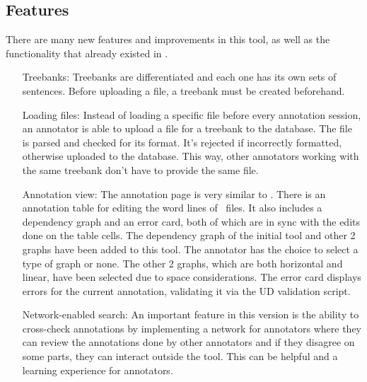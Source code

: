 \subsection{Features}
\label{sec:features}

There are many new features and improvements in this tool, as well as the functionality that already existed in \boatvone.

\begin{itemize}[before=\normalfont, font=\itshape, align=left]
\item[Treebanks:] Treebanks are differentiated and each one has its own sets of sentences.
Before uploading a \conllu{} file, a treebank must be created beforehand.

\item[Loading files:] Instead of loading a specific file before every annotation session, an annotator is able to upload a \conllu{} file for a treebank to the database.
The file is parsed and checked for its format. It's rejected if incorrectly formatted, otherwise uploaded to the database.
This way, other annotators working with the same treebank don't have to provide the same file.

\item[Annotation view:] The annotation page is very similar to \boatvone.
There is an annotation table for editing the word lines of \conllu\ files.
It also includes a dependency graph and an error card, both of which are in sync with the edits done on the table cells.
The dependency graph of the initial tool and other 2 graphs have been added to this tool.
The annotator has the choice to select a type of graph or none.
The other 2 graphs, which are both horizontal and linear, have been selected due to space considerations.
The error card displays errors for the current annotation, validating it via the UD validation script.

\item[Network-enabled search:] An important feature in this version is the ability to cross-check annotations by implementing a network for annotators where they can review the annotations done by other annotators and if they disagree on some parts, they can interact outside the tool.
This can be helpful and a learning experience for annotators.


\end{itemize}
